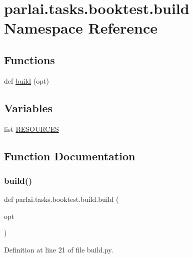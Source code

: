 \hypertarget{namespaceparlai_1_1tasks_1_1booktest_1_1build}{}\section{parlai.\+tasks.\+booktest.\+build Namespace Reference}
\label{namespaceparlai_1_1tasks_1_1booktest_1_1build}
\subsection*{Functions}
\begin{DoxyCompactItemize}
\item 
def \hyperlink{namespaceparlai_1_1tasks_1_1booktest_1_1build_acc4c0b0b235424ab52a434d122d857cc}{build} (opt)
\end{DoxyCompactItemize}
\subsection*{Variables}
\begin{DoxyCompactItemize}
\item 
list \hyperlink{namespaceparlai_1_1tasks_1_1booktest_1_1build_a6b172b24eaec6c8e34cfeab0f22587ff}{R\+E\+S\+O\+U\+R\+C\+ES}
\end{DoxyCompactItemize}


\subsection{Function Documentation}
\mbox{\label{namespaceparlai_1_1tasks_1_1booktest_1_1build_acc4c0b0b235424ab52a434d122d857cc}} 
\subsubsection{\texorpdfstring{build()}{build()}}
{\footnotesize\ttfamily def parlai.\+tasks.\+booktest.\+build.\+build (\begin{DoxyParamCaption}\item[{}]{opt }\end{DoxyParamCaption})}



Definition at line 21 of file build.\+py.


